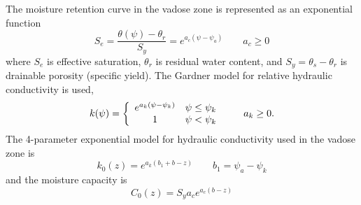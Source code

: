 \documentclass[12pt,letterpaper]{article}
\begin{document}
The moisture retention curve in the vadose zone is represented as an exponential function
\begin{equation}\nonumber
S_e = \frac{\theta(\psi) - \theta_r}{S_y} = e^{a_c \left( \psi - \psi_a \right)} \qquad a_c \ge 0 
\end{equation}
where $S_e$ is effective saturation, $\theta_r$ is residual water content, and $S_y=\theta_s - \theta_r$ is drainable porosity (specific yield).  The Gardner model for relative hydraulic conductivity is used,
\begin{equation}
  \nonumber
  k(\psi) = \left  \{ 
    \begin{array}{c c}
      e^{a_k \left( \psi - \psi_k\right)} & \psi \le \psi_k \\
      1 & \psi < \psi_k\\
    \end{array} 
\right . \qquad a_k \ge 0.
\end{equation}
The 4-parameter exponential model for hydraulic conductivity used in the vadose zone is 
\begin{equation}
  \label{eq:Gardner}
 k_0(z)=e^{a_k\left( b_1 + b - z\right)} \qquad b_1=\psi_a-\psi_k
\end{equation}
and the moisture capacity is
\begin{equation}
  \label{eq:mrc}
C_0(z) = S_y a_c e^{a_c \left( b-z\right)}
\end{equation}
\end{document}
